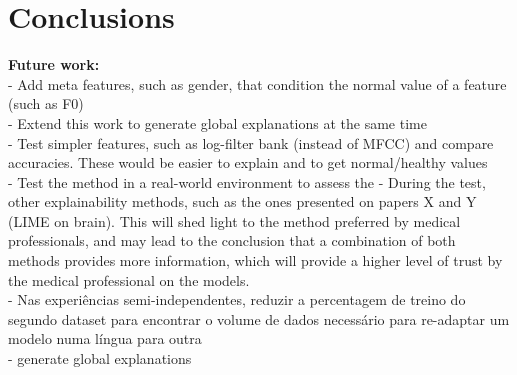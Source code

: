 
\chapter{Conclusions}
\label{ch:magna}



\textbf{Future work: }\\
 - Add meta features, such as gender, that condition the normal value of a feature (such as F0) \\
 - Extend this work to generate global explanations at the same time \\
 - Test simpler features, such as log-filter bank (instead of MFCC) and compare accuracies. These would be easier to explain and to get normal/healthy values \\
 - Test the method in a real-world environment to assess the 
 - During the test, other explainability methods, such as the ones presented on papers X and Y (LIME on brain). This will shed light to the method preferred by medical professionals, and may lead to the conclusion that a combination of both methods provides more information, which will provide a higher level of trust by the medical professional on the models.\\
 - Nas experiências semi-independentes, reduzir a percentagem de treino do segundo dataset para encontrar o volume de dados necessário para re-adaptar um modelo numa língua para outra \\
 - generate global explanations

